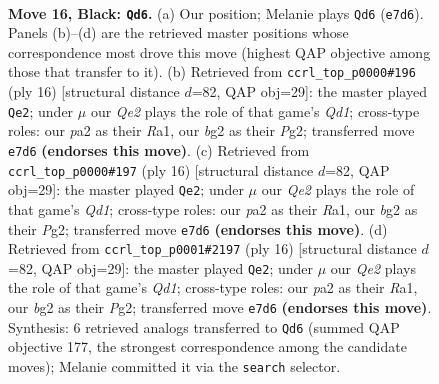 \documentclass[11pt]{article}
\begin{document}
\clearpage

\begin{figure}[p]\centering
\begin{subfigure}{0.46\textwidth}\centering
\resizebox{\linewidth}{!}{%
\newchessgame
\chessboard[
  setfen={r1bnrk2/1pppqppp/p7/B2P4/4n3/4PNP1/PP3PBP/R2Q1R1K b - - 8 16},
  showmover=false,
  pgfstyle=straightmove, color=movearrow, markmove={e7-d6}
]}
\caption{}
\end{subfigure}\hfill
\begin{subfigure}{0.46\textwidth}\centering
\resizebox{\linewidth}{!}{%
\newchessgame
\chessboard[
  setfen={rn1qk2r/pbp1bp1p/1p2pp2/8/2BPN3/5N2/PPP2PPP/R2QK2R w KQkq - 2 9},
  showmover=false,
  pgfstyle=straightmove, color=movearrow, markmove={d1-e2}
]}
\caption{}
\end{subfigure}
\\[4pt]
\begin{subfigure}{0.46\textwidth}\centering
\resizebox{\linewidth}{!}{%
\newchessgame
\chessboard[
  setfen={rn1qk2r/pbp1bp1p/1p2pp2/8/2BPN3/5N2/PPP2PPP/R2QK2R w KQkq - 2 9},
  showmover=false,
  pgfstyle=straightmove, color=movearrow, markmove={d1-e2}
]}
\caption{}
\end{subfigure}\hfill
\begin{subfigure}{0.46\textwidth}\centering
\resizebox{\linewidth}{!}{%
\newchessgame
\chessboard[
  setfen={rn1qk2r/pbp1bp1p/1p2pp2/8/2BPN3/5N2/PPP2PPP/R2QK2R w KQkq - 2 9},
  showmover=false,
  pgfstyle=straightmove, color=movearrow, markmove={d1-e2}
]}
\caption{}
\end{subfigure}
\caption{\textbf{Move 16, Black: \texttt{Qd6}.} (a) Our position; Melanie plays \texttt{Qd6} (\texttt{e7d6}). Panels (b)--(d) are the retrieved master positions whose correspondence most drove this move (highest QAP objective among those that transfer to it). (b) Retrieved from \texttt{ccrl\_top\_p0000\#196} (ply 16) [structural distance $d$=82, QAP obj=29]: the master played \texttt{Qe2}; under $\mu$ our \emph{Qe2} plays the role of that game's \emph{Qd1}; cross-type roles: our \emph{p}a2 as their \emph{R}a1, our \emph{b}g2 as their \emph{P}g2; transferred move \texttt{e7d6} \textbf{(endorses this move)}. (c) Retrieved from \texttt{ccrl\_top\_p0000\#197} (ply 16) [structural distance $d$=82, QAP obj=29]: the master played \texttt{Qe2}; under $\mu$ our \emph{Qe2} plays the role of that game's \emph{Qd1}; cross-type roles: our \emph{p}a2 as their \emph{R}a1, our \emph{b}g2 as their \emph{P}g2; transferred move \texttt{e7d6} \textbf{(endorses this move)}. (d) Retrieved from \texttt{ccrl\_top\_p0001\#2197} (ply 16) [structural distance $d$=82, QAP obj=29]: the master played \texttt{Qe2}; under $\mu$ our \emph{Qe2} plays the role of that game's \emph{Qd1}; cross-type roles: our \emph{p}a2 as their \emph{R}a1, our \emph{b}g2 as their \emph{P}g2; transferred move \texttt{e7d6} \textbf{(endorses this move)}. Synthesis: 6 retrieved analogs transferred to \texttt{Qd6} (summed QAP objective 177, the strongest correspondence among the candidate moves); Melanie committed it via the \texttt{search} selector.}
\label{fig:thought-m31}
\end{figure}
\end{document}
